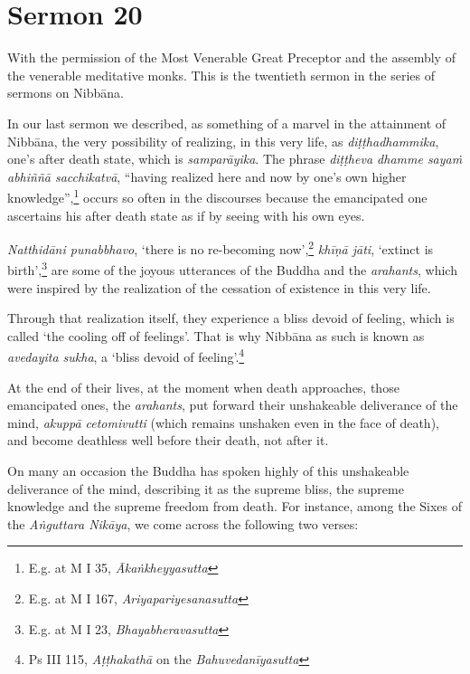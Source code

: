 \chapter{Sermon 20}

\NibbanaOpeningQuote

With the permission of the Most Venerable Great Preceptor and the assembly of the venerable meditative monks. This is the twentieth sermon in the series of sermons on Nibbāna.

In our last sermon we described, as something of a marvel in the attainment of Nibbāna, the very possibility of realizing, in this very life, as \emph{diṭṭhadhammika}, one's after death state, which is \emph{samparāyika}. The phrase \emph{diṭṭheva dhamme sayaṁ abhiññā sacchikatvā}, ``having realized here and now by one's own higher knowledge'',\footnote{E.g. at M I 35, \emph{Ākaṅkheyyasutta}} occurs so often in the discourses because the emancipated one ascertains his after death state as if by seeing with his own eyes.

\enlargethispage{\baselineskip}

\emph{Natthidāni punabbhavo}, `there is no re-becoming now',\footnote{E.g. at M I 167, \emph{Ariyapariyesanasutta}} \emph{khīṇā jāti}, `extinct is birth',\footnote{E.g. at M I 23, \emph{Bhayabheravasutta}} are some of the joyous utterances of the Buddha and the \emph{arahants}, which were inspired by the realization of the cessation of existence in this very life.

Through that realization itself, they experience a bliss devoid of feeling, which is called `the cooling off of feelings'. That is why Nibbāna as such is known as \emph{avedayita sukha}, a `bliss devoid of feeling'.\footnote{Ps III 115, \emph{Aṭṭhakathā} on the \emph{Bahuvedanīyasutta}}

At the end of their lives, at the moment when death approaches, those emancipated ones, the \emph{arahants}, put forward their unshakeable deliverance of the mind, \emph{akuppā cetomivutti} (which remains unshaken even in the face of death), and become deathless well before their death, not after it.

On many an occasion the Buddha has spoken highly of this unshakeable deliverance of the mind, describing it as the supreme bliss, the supreme knowledge and the supreme freedom from death. For instance, among the Sixes of the \emph{Aṅguttara Nikāya}, we come across the following two verses:

